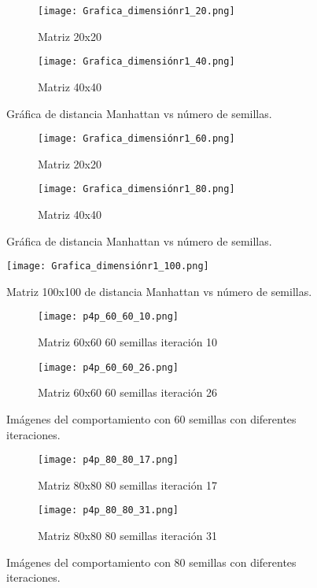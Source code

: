 \documentclass{article}
\begin{document}
\begin{figure}[H]
\centering
\begin{subfigure}[b]{0.45\linewidth}
\texttt{[image: Grafica\_dimensiónr1\_20.png]}
\caption{Matriz 20x20}
\end{subfigure}
\begin{subfigure}[b]{0.45\linewidth}
\texttt{[image: Grafica\_dimensiónr1\_40.png]}
\caption{Matriz 40x40}
\end{subfigure}
\caption{Gráfica de distancia Manhattan vs número de semillas.}
\label{fig:westminster}
\end{figure}

\begin{figure}[H]
\centering
\begin{subfigure}[b]{0.45\linewidth}
\texttt{[image: Grafica\_dimensiónr1\_60.png]}
\caption{Matriz 20x20}
\end{subfigure}
\begin{subfigure}[b]{0.45\linewidth}
\texttt{[image: Grafica\_dimensiónr1\_80.png]}
\caption{Matriz 40x40}
\end{subfigure}
\caption{Gráfica de distancia Manhattan vs número de semillas.}
\label{fig:westminster}
\end{figure}

\begin{figure}[H]
\centering
\texttt{[image: Grafica\_dimensiónr1\_100.png]}
\caption{\label{fig3}Matriz 100x100 de distancia Manhattan vs número de semillas.}
\end{figure}

\begin{figure}[H]
\centering
\begin{subfigure}[b]{0.30\linewidth}
\texttt{[image: p4p\_60\_60\_10.png]}
\caption{Matriz 60x60 60 semillas iteración 10}
\end{subfigure}
\begin{subfigure}[b]{0.30\linewidth}
\texttt{[image: p4p\_60\_60\_26.png]}
\caption{Matriz 60x60 60 semillas iteración 26}
\end{subfigure}
\caption{Imágenes del comportamiento con 60 semillas con diferentes iteraciones.}
\label{fig:westminster}
\end{figure}

\begin{figure}[H]
\centering
\begin{subfigure}[b]{0.30\linewidth}
\texttt{[image: p4p\_80\_80\_17.png]}
\caption{Matriz 80x80 80 semillas iteración 17}
\end{subfigure}
\begin{subfigure}[b]{0.30\linewidth}
\texttt{[image: p4p\_80\_80\_31.png]}
\caption{Matriz 80x80 80 semillas iteración 31}
\end{subfigure}
\caption{Imágenes del comportamiento con 80 semillas con diferentes iteraciones.}
\label{fig:westminster}
\end{figure}
\end{document}
